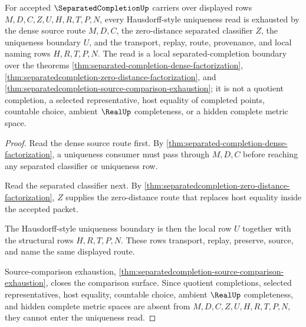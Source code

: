 \begin{theorem}
\label{thm:separatedcompletion-hausdorff-uniqueness-route}
For accepted $\SeparatedCompletionUp$ carriers over displayed rows $M,D,C,Z,U,H,R,T,P,N$, every Hausdorff-style uniqueness read is exhausted by the dense source route $M,D,C$, the zero-distance separated classifier $Z$, the uniqueness boundary $U$, and the transport, replay, route, provenance, and local naming rows $H,R,T,P,N$. The read is a local separated-completion boundary over the theorems \autoref{thm:separated-completion-dense-factorization}, \autoref{thm:separatedcompletion-zero-distance-factorization}, and \autoref{thm:separatedcompletion-source-comparison-exhaustion}; it is not a quotient completion, a selected representative, host equality of completed points, countable choice, ambient $\RealUp$ completeness, or a hidden complete metric space.
\end{theorem}
\begin{proof}
Read the dense source route first. By \autoref{thm:separated-completion-dense-factorization}, a uniqueness consumer must pass through $M,D,C$ before reaching any separated classifier or uniqueness row.

Read the separated classifier next. By \autoref{thm:separatedcompletion-zero-distance-factorization}, $Z$ supplies the zero-distance route that replaces host equality inside the accepted packet.

The Hausdorff-style uniqueness boundary is then the local row $U$ together with the structural rows $H,R,T,P,N$. These rows transport, replay, preserve, source, and name the same displayed route.

Source-comparison exhaustion, \autoref{thm:separatedcompletion-source-comparison-exhaustion}, closes the comparison surface. Since quotient completions, selected representatives, host equality, countable choice, ambient $\RealUp$ completeness, and hidden complete metric spaces are absent from $M,D,C,Z,U,H,R,T,P,N$, they cannot enter the uniqueness read.
\end{proof}

